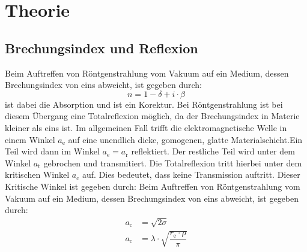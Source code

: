 
\section{Theorie}
\label{sec:Theorie}
\subsection{Brechungsindex und Reflexion}
\label{sec:Brechungsindex}
Beim Auftreffen von Röntgenstrahlung vom Vakuum auf ein Medium, dessen Brechungsindex von eins abweicht, ist gegeben durch:
\begin{equation}
  \label{eqn:Brechungsindex}
  n=1-\delta+ i\cdot \beta
\end{equation}
\beta ist dabei die Absorption und \delta ist ein Korektur. Bei Röntgenstrahlung ist bei diesem Übergang eine Totalreflexion möglich, da der Brechungsindex in Materie kleiner als eins ist. Im allgemeinen Fall trifft die elektromagnetische Welle in einem Winkel $a_\mathrm{e}$ auf eine unendlich dicke, gomogenen, glatte Materialschicht.Ein Teil wird dann im Winkel $a_\mathrm{e}=a_\mathrm{r}$ reflektiert. Der restliche Teil wird unter dem Winkel $a_\mathrm{t}$ gebrochen und transmitiert. Die Totalreflexion tritt hierbei unter dem kritischen Winkel $a_\mathrm{c}$ auf. Dies bedeutet, dass keine Transmission auftritt. Dieser Kritische Winkel ist gegeben durch:
\label{sec:Brechungsindex}
Beim Auftreffen von Röntgenstrahlung vom Vakuum auf ein Medium, dessen Brechungsindex von eins abweicht, ist gegeben durch:
\begin{align}
  \label{eqn:Totalreflexion}
  a_\mathrm{c} &= \sqrt{2 \sigma} \\
  a_\mathrm{c} &= \lambda\cdot\sqrt{\dfrac{r_\mathrm{e}\cdot\rho}{\pi}}
\end{align}
